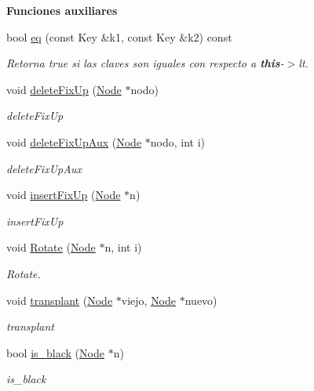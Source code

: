 \begin{Indent}{\bf Funciones auxiliares}\par
\begin{DoxyCompactItemize}
\item 
bool \hyperlink{classaed2_1_1map_ab45cb28bb215cd229383d88b96b3f624_ab45cb28bb215cd229383d88b96b3f624}{eq} (const Key \&k1, const Key \&k2) const 
\begin{DoxyCompactList}\small\item\em Retorna true si las claves son iguales con respecto a {\bfseries this}-\/$>$lt. \end{DoxyCompactList}\item 
void \hyperlink{classaed2_1_1map_af2eed16fe5e8bdbe5a9d979a5d136732_af2eed16fe5e8bdbe5a9d979a5d136732}{delete\+Fix\+Up} (\hyperlink{structaed2_1_1map_1_1Node}{Node} $\ast$nodo)
\begin{DoxyCompactList}\small\item\em delete\+Fix\+Up \end{DoxyCompactList}\item 
void \hyperlink{classaed2_1_1map_ab2554bfd33a22884bd4c0576ed5c2bb5_ab2554bfd33a22884bd4c0576ed5c2bb5}{delete\+Fix\+Up\+Aux} (\hyperlink{structaed2_1_1map_1_1Node}{Node} $\ast$nodo, int i)
\begin{DoxyCompactList}\small\item\em delete\+Fix\+Up\+Aux \end{DoxyCompactList}\item 
void \hyperlink{classaed2_1_1map_a5a0e59badb0c55114e2fcce75437e4cd_a5a0e59badb0c55114e2fcce75437e4cd}{insert\+Fix\+Up} (\hyperlink{structaed2_1_1map_1_1Node}{Node} $\ast$n)
\begin{DoxyCompactList}\small\item\em insert\+Fix\+Up \end{DoxyCompactList}\item 
void \hyperlink{classaed2_1_1map_a54b1ea9f8c707232c744a4ac5c5302d2_a54b1ea9f8c707232c744a4ac5c5302d2}{Rotate} (\hyperlink{structaed2_1_1map_1_1Node}{Node} $\ast$n, int i)
\begin{DoxyCompactList}\small\item\em Rotate. \end{DoxyCompactList}\item 
void \hyperlink{classaed2_1_1map_aa7babdedd4e32da6bf7f8262ccfe8fa6_aa7babdedd4e32da6bf7f8262ccfe8fa6}{transplant} (\hyperlink{structaed2_1_1map_1_1Node}{Node} $\ast$viejo, \hyperlink{structaed2_1_1map_1_1Node}{Node} $\ast$nuevo)
\begin{DoxyCompactList}\small\item\em transplant \end{DoxyCompactList}\item 
bool \hyperlink{classaed2_1_1map_aa749744eb0e858c97ac1571d49925012_aa749744eb0e858c97ac1571d49925012}{is\+\_\+black} (\hyperlink{structaed2_1_1map_1_1Node}{Node} $\ast$n)
\begin{DoxyCompactList}\small\item\em is\+\_\+black \end{DoxyCompactList}\end{DoxyCompactItemize}
\end{Indent}
